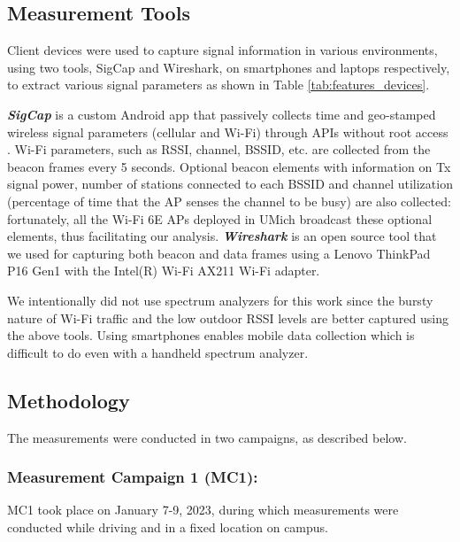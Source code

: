 \documentclass[sigconf,10pt]{acmart}
\begin{document}
\subsection{Measurement Tools}
Client devices were used to capture signal information in various environments, using two tools, SigCap and Wireshark, on smartphones and laptops respectively, to extract various signal parameters as shown in Table \ref{tab:features_devices}.

{\it \bf SigCap} is a custom Android app that passively collects time and geo-stamped wireless signal parameters (cellular and Wi-Fi) through APIs without root access \cite{9261954}. Wi-Fi parameters, such as RSSI, channel, BSSID, etc. are collected from the beacon frames every 5 seconds. Optional beacon elements with information on Tx signal power, number of stations connected to each BSSID and channel utilization (percentage of time that the AP senses the channel to be busy) are also collected:  fortunately, all the Wi-Fi 6E APs deployed in UMich broadcast these optional elements, thus facilitating our analysis. {\it \bf Wireshark} is an open source tool that we used for capturing both beacon and data frames using a Lenovo ThinkPad P16 Gen1 with the Intel(R) Wi-Fi AX211 Wi-Fi adapter.

We intentionally did not use spectrum analyzers for this work since the bursty nature of Wi-Fi traffic and the low outdoor RSSI levels are better captured using the above tools. Using smartphones enables mobile data collection which is difficult to do even with a handheld spectrum analyzer.

\subsection{Methodology}
The measurements were conducted in two campaigns, as described below.

\subsubsection{Measurement Campaign 1 (MC1):}
MC1 took place on January 7-9, 2023, during which measurements were conducted while driving and in a fixed location on campus. 
\end{document}
